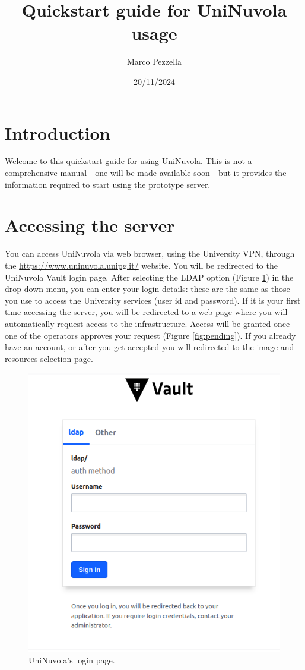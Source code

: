 \documentclass[a4paper,11pt]{article}
\begin{document}
\title{Quickstart guide for UniNuvola usage}
\author{Marco Pezzella}
\date{20/11/2024}

\maketitle

\section{Introduction}

Welcome to this quickstart guide for using UniNuvola. This is not a comprehensive manual—one will be made available soon—but it provides the information required to start using the prototype server.

\section{Accessing the server}

You can access UniNuvola via web browser, using the University VPN, through the  \href{https://www.uninuvola.unipg.it/}{https://www.uninuvola.unipg.it/} website. You will be redirected to the UniNuvola Vault login page. After selecting the LDAP option (Figure \ref{fig:login}) in the drop-down menu, you can enter your login details: these are the same as those you use to access the University services (user id and password). If it is your first time accessing the server, you will be redirected to a web page  where you will automatically request access to the infrastructure. Access will be granted once one of the operators approves your request (Figure \ref{fig:pending}). If you already have an account, or after you get accepted you will redirected to the image and resources selection page. 


\begin{figure}[!ht]
    \centering
    \includegraphics[width=0.5\linewidth]{login_page.png}
    \caption{UniNuvola's login page.}
    \label{fig:login}
\end{figure}
\end{document}
